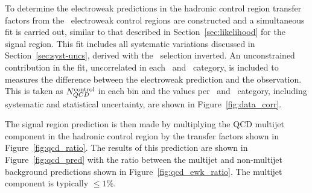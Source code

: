 To determine the electroweak predictions in the hadronic control region transfer factors 
from the \mhtmet~electroweak control regions are constructed and a simultaneous
fit is carried out, similar to that described in Section~\ref{sec:likelihood} for the signal region. 
This fit includes all systematic variations discussed in Section~\ref{sec:syst-uncs}, 
derived with the \mhtmet~selection inverted. An unconstrained contribution in the fit, 
uncorrelated in each \njet~and \scalht~category, is included to measures the difference between 
the electroweak prediction and the observation. This is taken as $N_{QCD}^{\rm control}$ in each bin and
the values per \njet~and \scalht~category, including systematic and statistical uncertainty,
are shown in Figure~\ref{fig:data_corr}. 

The signal region prediction is then made by multiplying the QCD multijet component in the hadronic 
control region by the transfer factors shown in Figure~\ref{fig:qcd_ratio}. The results of this prediction
are shown in Figure~\ref{fig:qcd_pred} with the ratio between the multijet and non-multijet background
predictions shown in Figure~\ref{fig:qcd_ewk_ratio}. The multijet component is typically $\le 1\%$. 

